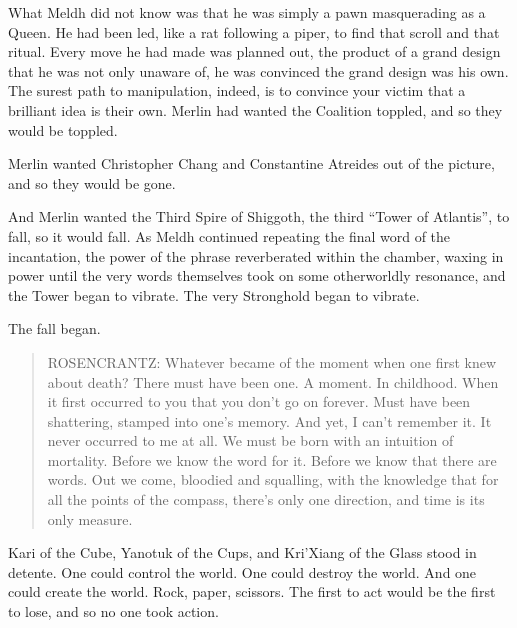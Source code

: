 What Meldh did not know was that he was simply a pawn masquerading as a Queen. He had been led, like a rat following a piper, to find that scroll and that ritual. Every move he had made was planned out, the product of a grand design that he was not only unaware of, he was convinced the grand design was his own. The surest path to manipulation, indeed, is to convince your victim that a brilliant idea is their own.
\SmallVSpace
Merlin had wanted the Coalition toppled, and so they would be toppled.

Merlin wanted Christopher Chang and Constantine Atreides out of the picture, and so they would be gone.

And Merlin wanted the Third Spire of Shiggoth, the third “Tower of Atlantis”, to fall, so it would fall.
\SmallVSpace
As Meldh continued repeating the final word of the incantation, the power of the phrase reverberated within the chamber, waxing in power until the very words themselves took on some otherworldly resonance, and the Tower began to vibrate. The very Stronghold began to vibrate.

The fall began.

\simpleline

\begin{quote}\small ROSENCRANTZ: Whatever became of the moment when one first knew about death? There must have been one. A moment. In childhood. When it first occurred to you that you don’t go on forever. Must have been shattering, stamped into one’s memory. And yet, I can’t remember it. It never occurred to me at all. We must be born with an intuition of mortality. Before we know the word for it. Before we know that there are words. Out we come, bloodied and squalling, with the knowledge that for all the points of the compass, there’s only one direction, and time is its only measure.\end{quote}
\simpleline	
{}

Kari of the Cube, Yanotuk of the Cups, and Kri’Xiang of the Glass stood in detente. One could control the world. One could destroy the world. And one could create the world. Rock, paper, scissors. The first to act would be the first to lose, and so no one took action.


